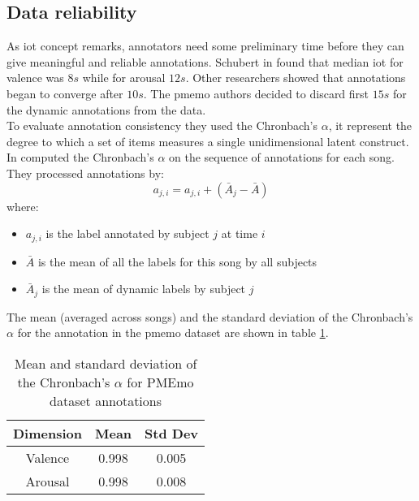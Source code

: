 \subsection{Data reliability}
As \gls{iot} concept remarks, annotators need some preliminary time before they can give meaningful and reliable annotations. Schubert in \cite{schubert2013reliability} found that median \gls{iot} for valence was $8s$ while for arousal $12s$. Other researchers showed that annotations began to converge after $10s$. The \gls{pmemo} authors decided to discard first $15s$ for the dynamic annotations from the data.
\\ \indent
To evaluate annotation consistency they used the Chronbach's $\alpha$, it represent the degree to which a set of items measures a single unidimensional latent construct. In \cite{zhang2018pmemo} computed the Chronbach's $\alpha$ on the sequence of annotations for each song.
\\
They processed annotations by:
\begin{equation}
	a_{j,i}=a_{j,i}+(\bar{A}_j-\bar{A})
\end{equation}
where:
\begin{itemize}
	\item $a_{j,i}$ is the label annotated by subject $j$ at time $i$
	\item $\bar{A}$ is the mean of all the labels for this song by all subjects
	\item $\bar{A}_j$ is the mean of dynamic labels by subject $j$
\end{itemize}
The mean (averaged across songs) and the standard deviation of the Chronbach's $\alpha$ for the annotation in the \gls{pmemo} dataset are shown in table \ref{table:Chronbach}.
\begin{table}[h!]
	\centering
	\begin{tabular}{|c|c|c|}
		\hline
		Dimension & Mean & Std Dev \\ [0.5ex] 
		\hline\hline Valence & 0.998 & 0.005 \\ 
		\hline Arousal & 0.998 & 0.008 \\ 
		\hline
	\end{tabular}
	\caption{Mean and standard deviation of the Chronbach's $\alpha$ for PMEmo dataset annotations}
	\label{table:Chronbach}
\end{table}

